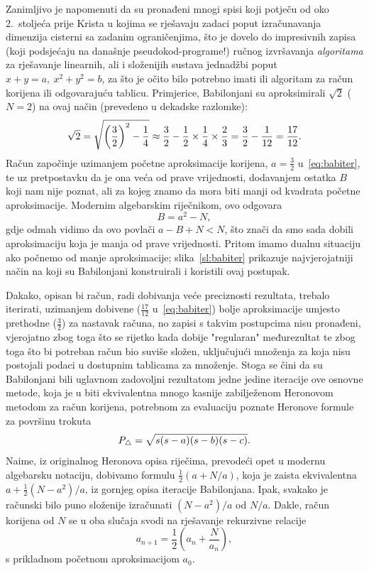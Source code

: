 \documentclass[12pt]{scrartcl}
\begin{document}
Zanimljivo je napomenuti da su pronađeni mnogi spisi koji potječu od oko 2.~stoljeća prije Krista u kojima
se rješavaju zadaci poput izračunavanja dimenzija cisterni sa zadanim ograničenjima, što je dovelo do impresivnih zapisa (koji podsjećaju
na današnje pseudokod-programe!) ručnog izvršavanja
 \emph{algoritama} za rješavanje linearnih, ali i složenijih sustava jednadžbi poput $x+y=a,\ x^2+y^2=b$, za što je očito bilo potrebno
imati ili algoritam za račun korijena ili odgovarajuću tablicu. Primjerice, Babilonjani su aproksimirali $\sqrt 2$ ($N=2$) na ovaj način (prevedeno
u dekadske razlomke)\cite{fowler1998}:
\begin{equation}\label{eq:babiter}
    \sqrt 2 = \sqrt{\left(\frac32\right)^2 - \frac14}\approx\frac32 - \frac12\times\frac14\times\frac23 = \frac32 - \frac{1}{12} = \frac{17}{12}\text.
\end{equation}
Račun započinje uzimanjem početne aproksimacije korijena, $a=\frac32$ u~\eqref{eq:babiter}, te uz pretpostavku da je ona veća od prave vrijednosti,
dodavanjem ostatka $B$ koji nam nije poznat, ali za kojeg znamo da mora biti manji od kvadrata početne aproksimacije. Modernim algebarskim riječnikom,
ovo odgovara
\[
    B=a^2-N,
\]
gdje odmah vidimo da ovo povlači $a-B+N<N$, što znači da smo sada dobili aproksimaciju koja je manja od prave vrijednosti. Pritom imamo dualnu situaciju
ako počnemo od manje aproksimacije; slika~\ref{sl:babiter} prikazuje najvjerojatniji način na koji su Babilonjani konstruirali i koristili ovaj postupak.

Dakako, opisan bi račun, radi dobivanja veće preciznosti rezultata, trebalo iterirati,
uzimanjem dobivene ($\frac{17}{12}$ u~\eqref{eq:babiter}) bolje aproksimacije umjesto prethodne
($\frac32$) za nastavak računa, no zapisi s takvim postupcima nisu pronađeni,
vjerojatno zbog toga što se rijetko kada dobije "regularan" međurezultat te zbog toga što
bi potreban račun bio suviše složen, uključujući množenja za koja nisu postojali podaci u dostupnim tablicama za množenje. Stoga se čini da su 
Babilonjani bili uglavnom zadovoljni rezultatom jedne jedine iteracije ove osnovne metode, koja je u biti ekvivalentna mnogo kasnije zabilježenom Heronovom
metodom za račun korijena, potrebnom za evaluaciju poznate Heronove formule za površinu trokuta
\begin{equation*}
    P_{\triangle} = \sqrt{s(s-a)(s-b)(s-c)}\text.
\end{equation*}
Naime, iz originalnog Heronova opisa riječima, prevodeći opet u modernu algebarsku notaciju, dobivamo formulu $\frac12(a+N/a)$, koja je
zaista ekvivalentna $a+\frac12(N-a^2)/a$, iz gornjeg opisa iteracije Babilonjana. Ipak, svakako je računski bilo puno složenije izračunati
$(N-a^2)/a$ od $N/a$. %
Dakle, račun korijena od $N$ se u oba slučaja svodi na rješavanje rekurzivne relacije
\begin{equation}
    a_{n+1}=\frac12\left(a_n+\frac{N}{a_n}\right),
\end{equation}
s prikladnom početnom aproksimacijom $a_0$.
\end{document}

